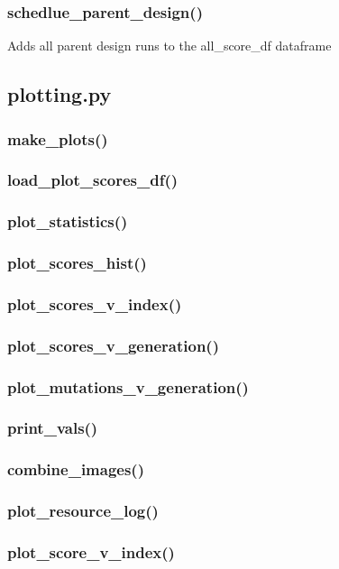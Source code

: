 \documentclass[10pt]{extarticle}
\begin{document}
\subsubsection{schedlue\_parent\_design()}
Adds all parent design runs to the all\_score\_df dataframe
\subsection{plotting.py}
\subsubsection{make\_plots()}
\subsubsection{load\_plot\_scores\_df()}
\subsubsection{plot\_statistics()}
\subsubsection{plot\_scores\_hist()}
\subsubsection{plot\_scores\_v\_index()}
\subsubsection{plot\_scores\_v\_generation()}
\subsubsection{plot\_mutations\_v\_generation()}
\subsubsection{print\_vals()}
\subsubsection{combine\_images()}
\subsubsection{plot\_resource\_log()}
\subsubsection{plot\_score\_v\_index()}
\end{document}
